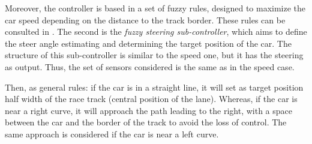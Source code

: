 \documentclass[conference]{IEEEtran}
\begin{document}
Moreover, the controller is based in a set of fuzzy rules, designed to maximize the car speed depending on the distance to the track border. These rules can be consulted in \cite{evo17}.
%
%
%
%
%
%
%
The second is the {\em fuzzy steering sub-controller}, which aims to define the steer angle estimating and determining the target position of the car. 
%
The structure of this sub-controller is similar to the speed one, but it has the steering as output. Thus, the set of sensors considered is the same as in the speed case.

Then, as general rules: if the car is in a straight line, it will set as target position half width of the race track (central position of the lane). Whereas, if the car is near a right curve, it will approach the path leading to the right, with a space between the car and the border of the track to avoid the loss of control. The same approach is considered if the car is near a left curve.
\end{document}
